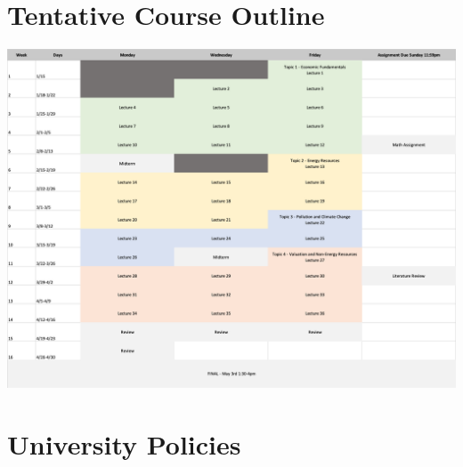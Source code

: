 \documentclass[11pt]{article}
\begin{document}
\section*{Tentative Course Outline}
\includegraphics[width=\linewidth]{schedule.png}



\newpage
\section*{University Policies}
\end{document}
